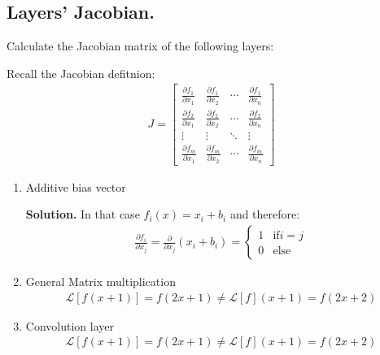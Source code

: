 \documentclass{article}
\begin{document}
\subsection{Layers’ Jacobian.} Calculate the Jacobian matrix of the following layers:

Recall the Jacobian defitnion:
  \begin{equation*}
    \begin{split}
J = \begin{bmatrix}
\frac{\partial f_1}{\partial x_1} & \frac{\partial f_1}{\partial x_2} & \cdots & \frac{\partial f_1}{\partial x_n} \\
\frac{\partial f_2}{\partial x_1} & \frac{\partial f_2}{\partial x_2} & \cdots & \frac{\partial f_2}{\partial x_n} \\
\vdots & \vdots & \ddots & \vdots \\
\frac{\partial f_m}{\partial x_1} & \frac{\partial f_m}{\partial x_2} & \cdots & \frac{\partial f_m}{\partial x_n}
\end{bmatrix}
    \end{split}
\end{equation*}

\begin{enumerate}
  \item Additive bias vector 

    \textbf{Solution.} In that case $f_i(x) = x_{i} + b_{i}$ and therefore: 
  \begin{equation*}
    \begin{split}
      \frac{\partial f_i}{\partial x_j} = \frac{\partial }{\partial x_j} \left( x_{i} + b_{i} \right) = \begin{cases} 1 & \text{if} i = j \\ 0 & \text{else}  \end{cases}
    \end{split}
\end{equation*}
  \item General Matrix multiplication
  \begin{equation*}
    \begin{split}
    \mathcal{L}[f(x+1)] = f(2x+1) \neq \mathcal{L}[f](x+1)= f(2x + 2)
    \end{split}
\end{equation*}
  \item Convolution layer
  \begin{equation*}
    \begin{split}
    \mathcal{L}[f(x+1)] = f(2x+1) \neq \mathcal{L}[f](x+1)= f(2x + 2)
    \end{split}
\end{equation*}
\end{enumerate}
\end{document}
